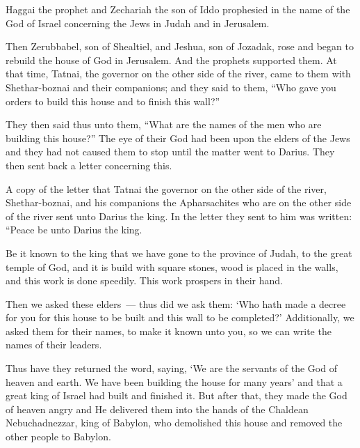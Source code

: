 
\begin{inparaenum}
   Haggai the prophet and Zechariah the son of Iddo prophesied in the name of the God of Israel concerning the Jews in Judah and in Jerusalem.%
  
   Then Zerubbabel, son of Shealtiel, and Jeshua, son of Jozadak, rose and began to rebuild the house of God in Jerusalem. And the prophets supported them.%
   At that time, Tatnai, the governor on the other side of the river, came to them with Shethar-boznai and their companions; and they said to them, ``Who gave you orders to build this house and to finish this wall?''%
  
   They then said thus unto them, ``What are the names of the men who are building this house?''%
   The eye of their God had been upon the elders of the Jews and they had not caused them to stop until the matter went to Darius. They then sent back a letter concerning this.%
  
   A copy of the letter that Tatnai the governor on the other side of the river, Shethar-boznai, and his companions the Apharsachites who are on the other side of the river sent unto Darius the king.%
   In the letter they sent to him was written: ``Peace be unto Darius the king.%
  
   Be it known to the king that we have gone to the province of Judah, to the great temple of God, and it is build with square stones, wood is placed in the walls, and this work is done speedily. This work prospers in their hand.%
  
   Then we asked these elders~--- thus did we ask them: `Who hath made a decree for you for this house to be built and this wall to be completed?'%
   Additionally, we asked them for their names, to make it known unto you, so we can write the names of their leaders.%
  
   Thus have they returned the word, saying, `We are the servants of the God of heaven and earth. We have been building the house for many years' and that a great king of Israel had built and finished it.%
   But after that, they made the God of heaven angry and He delivered them into the hands of the Chaldean Nebuchadnezzar, king of Babylon, who demolished this house and removed the other people to Babylon.%
  

\end{inparaenum}
